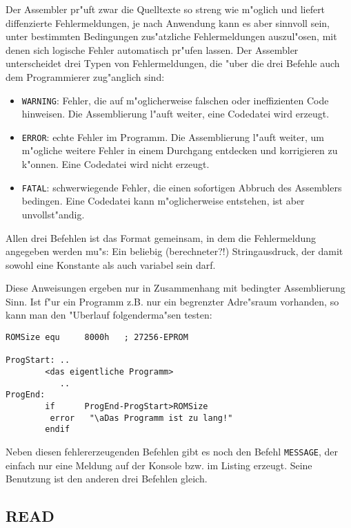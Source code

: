 \documentclass[12pt,a4paper,twoside]{report}
\makeatletter
\newcommand{\tty}[1]{{\tt #1}}
\newcommand{\ttindex}[1]{\index{#1@{\tt #1}}}
\makeatother
\begin{document}
Der Assembler pr"uft zwar die Quelltexte so streng wie m"oglich und
liefert diffenzierte Fehlermeldungen, je nach Anwendung kann es
aber sinnvoll sein, unter bestimmten Bedingungen zus"atzliche
Fehlermeldungen auszul"osen, mit denen sich logische Fehler automatisch
pr"ufen lassen.  Der Assembler unterscheidet drei Typen von Fehlermeldungen,
die "uber die drei Befehle auch dem Programmierer zug"anglich sind:
\begin{itemize}
\item{\tty{WARNING}: Fehler, die auf m"oglicherweise falschen oder
      ineffizienten Code hinweisen.  Die Assemblierung l"auft weiter,
      eine Codedatei wird erzeugt.}
\item{\tty{ERROR}: echte Fehler im Programm.  Die Assemblierung l"auft weiter,
      um m"ogliche weitere Fehler in einem Durchgang entdecken und
      korrigieren zu k"onnen.  Eine Codedatei wird nicht erzeugt.}
\item{\tty{FATAL}: schwerwiegende Fehler, die einen sofortigen Abbruch des
      Assemblers bedingen.  Eine Codedatei kann m"oglicherweise entstehen,
      ist aber unvollst"andig.}
\end{itemize}
Allen drei Befehlen ist das Format gemeinsam, in dem die Fehlermeldung
angegeben werden mu"s: Ein beliebig (berechneter?!) Stringausdruck, der
damit sowohl eine Konstante als auch variabel sein darf.
\par
Diese Anweisungen ergeben nur in Zusammenhang mit bedingter Assemblierung
Sinn.  Ist f"ur ein Programm z.B. nur ein begrenzter Adre"sraum vorhanden,
so kann man den "Uberlauf folgenderma"sen testen:
\begin{verbatim}
ROMSize equ     8000h   ; 27256-EPROM

ProgStart: ..
        <das eigentliche Programm>
           ..
ProgEnd:
        if      ProgEnd-ProgStart>ROMSize
         error   "\aDas Programm ist zu lang!"
        endif
\end{verbatim}
Neben diesen fehlererzeugenden Befehlen gibt es noch den Befehl
\tty{MESSAGE}, der einfach nur eine Meldung auf der Konsole bzw. im
Listing erzeugt.  Seine Benutzung ist den anderen drei Befehlen
gleich.


\subsection{READ}
\ttindex{READ}
\end{document}
